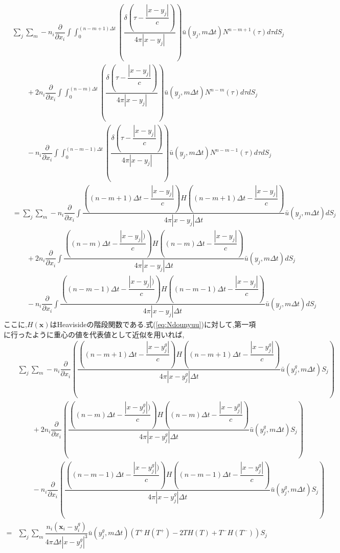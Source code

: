 \documentclass[dvipdfmx]{ampbt}
\begin{document}
\begin{align}
\label{eq:Ndounyuu}
&\sum_j \sum_m -n_i\dfrac{\partial}{\partial x_i}\int\!\!\!  \int_{0}^{(n-m+1)\Delta t} \left( \dfrac{\delta(\tau- \dfrac{|x-y_j|}{c})}{4\pi|x-y_j|} \right) \bar{u}(y_j,m\Delta t)N^{n-m+1}(\tau)d\tau dS_j \nonumber\\
&\hspace{2em} +2n_i\dfrac{\partial}{\partial x_i}\int\!\!\!  \int_{0}^{(n-m)\Delta t} \left( \dfrac{\delta(\tau- \dfrac{|x-y_j|}{c})}{4\pi|x-y_j|} \right) \bar{u}(y_j,m\Delta t)N^{n-m}(\tau)d\tau dS_j \nonumber \\
&\hspace{2em} -n_i\dfrac{\partial}{\partial x_i}\int\!\!\!  \int_{0}^{(n-m-1)\Delta t} \left( \dfrac{\delta(\tau- \dfrac{|x-y_j|}{c})}{4\pi|x-y_j|} \right) \bar{u}(y_j,m\Delta t)N^{n-m-1}(\tau)d\tau dS_j \nonumber\\
&= \sum_j \sum_m -n_i\dfrac{\partial}{\partial x_i}\int\!\!\! \dfrac{( (n-m+1)\Delta t - \dfrac{|x-y_j|}{c} )H((n-m+1)\Delta t - \dfrac{|x-y_j|}{c} )}{4\pi|x-y_j|\Delta t} \bar{u}(y_j,m\Delta t) dS_j \nonumber\\
&\hspace{2em} +2n_i\dfrac{\partial}{\partial x_i}\int\!\!\!  \dfrac{( (n-m)\Delta t- \dfrac{|x-y_j|)}{c} )H((n-m)\Delta t - \dfrac{|x-y_j|}{c} )}{4\pi|x-y_j|\Delta t}  \bar{u}(y_j,m\Delta t) dS_j \nonumber \\
&\hspace{2em} -n_i\dfrac{\partial}{\partial x_i}\int\!\!\!  \dfrac{( (n-m-1)\Delta t - \dfrac{|x-y_j|)}{c} )H((n-m-1)\Delta t - \dfrac{|x-y_j|}{c})}{4\pi|x-y_j|\Delta t}  \bar{u}(y_j,m\Delta t) dS_j
\end{align}
ここに,$H(\bm{x})$はHeavisideの階段関数である.式(\ref{eq:Ndounyuu})に対して,第一項に行ったように重心の値を代表値として近似を用いれば,
\begin{align}
\label{eq:ヘヴィサイド後}
&\sum_j \sum_m -n_i\dfrac{\partial}{\partial x_i} \left(\dfrac{( (n-m+1)\Delta t - \dfrac{|x-y^g_j|}{c} )H((n-m+1)\Delta t - \dfrac{|x-y^g_j|}{c} )}{4\pi|x-y^g_j|\Delta t} \bar{u}(y^g_j,m\Delta t) S_j \right) \nonumber\\
&\hspace{2em} +2n_i\dfrac{\partial}{\partial x_i}\left(\dfrac{( (n-m)\Delta t- \dfrac{|x-y^g_j|)}{c} )H((n-m)\Delta t - \dfrac{|x-y^g_j|}{c} )}{4\pi|x-y^g_j|\Delta t}  \bar{u}(y^g_j,m\Delta t) S_j \right) \nonumber \\
&\hspace{2em} -n_i\dfrac{\partial}{\partial x_i}\left(\dfrac{( (n-m-1)\Delta t - \dfrac{|x-y^g_j|)}{c} )H((n-m-1)\Delta t - \dfrac{|x-y^g_j|}{c})}{4\pi|x-y^g_j|\Delta t}  \bar{u}(y^g_j,m\Delta t) S_j \right) \nonumber \\
=&\sum_j \sum_m \dfrac{n_i(\bm{x}_i-y^g_i)}{4\pi \Delta t |x-y^g_j|^3}  \bar{u}(y^g_j,m\Delta t)(T^+H(T^+)-2TH(T)+T^-H(T^-) ) S_j  \nonumber\\
\end{align}
\end{document}
